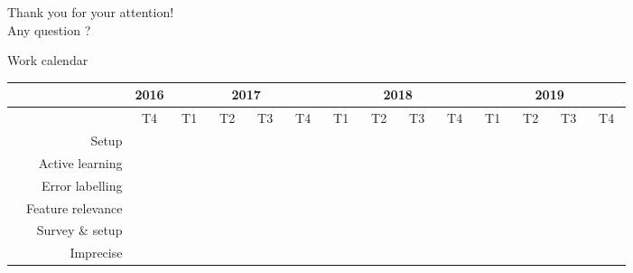 \documentclass{beamer}
\begin{document}
\begin{frame}
\begin{center}
	Thank you for your attention! \\ 
	Any question ? 
\end{center}
\end{frame}

\begin{frame}{Work calendar}
	\footnotesize
	\begin{table}
	\hspace*{-0.5cm}
	\setlength\tabcolsep{3pt} %
	\begin{tabular}{|c|r|ccc|cccccccccccc|cccccccccccc|cccccccccccc|}
		\hline
		& & \multicolumn{3}{c|}{2016} & \multicolumn{12}{c|}{2017} & \multicolumn{12}{c|}{2018}  & \multicolumn{12}{c|}{2019}  \\
		\hline	
		& & \multicolumn{3}{c|}{T4} & \multicolumn{3}{c|}{T1} & \multicolumn{3}{c|}{T2} & \multicolumn{3}{c|}{T3} & \multicolumn{3}{c|}{T4} & \multicolumn{3}{c|}{T1} & \multicolumn{3}{c|}{T2} & \multicolumn{3}{c|}{T3} & \multicolumn{3}{c|}{T4}  & \multicolumn{3}{c|}{T1} & \multicolumn{3}{c|}{T2} & \multicolumn{3}{c|}{T3} & \multicolumn{3}{c|}{T4}\\ 
		\hline
		& Setup & \cellcolor{black} & \cellcolor{black} & \cellcolor{black} & \cellcolor{black} & \cellcolor{black} & & & & & & & & & & & & & & & & & & & & & & & & & & & & & & & & & & \\
		\hdashline
		 \parbox[t]{2mm}{} & Active learning & & & & & &  &  &  &  & & & & & & & & & & & & & & & & & & & & & & & & & & & & & &\\
		& Error labelling & & & & & & & & & &  &  &  &  &  &  & & & & & & & & & & & & & & & & & & & & & & & & \\
		& Feature relevance & & & & & & & & & & & & & & & &  &  &  &  &  &  & & & & & & & & & & & & & & & & & & \\
		\hdashline
		 \parbox[t]{2mm}{} & Survey \& setup & & & & & & & & & & & & & & & & & & & & & &  & & & & & & & & & & & & & & & & & \\
		& Imprecise  & & & & & & & & & & & & & & & & & & & & & & &  &  &  &  &  &  &  & & & & & & & & & & \\

\end{tabular}
\end{table}
\end{frame}
\end{document}
